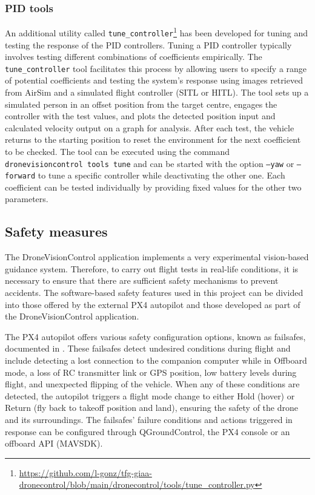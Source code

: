 \subsubsection{PID tools}
An additional utility called \texttt{tune\_controller}\footnote{\url{https://github.com/l-gonz/tfg-giaa-dronecontrol/blob/main/dronecontrol/tools/tune_controller.py}} has been developed for tuning and testing the response of the PID controllers. Tuning a PID controller typically involves testing different combinations of coefficients empirically. The \texttt{tune\_controller} tool facilitates this process by allowing users to specify a range of potential coefficients and testing the system's response using images retrieved from AirSim and a simulated flight controller (SITL or HITL). The tool sets up a simulated person in an offset position from the target centre, engages the controller with the test values, and plots the detected position input and calculated velocity output on a graph for analysis. After each test, the vehicle returns to the starting position to reset the environment for the next coefficient to be checked. The tool can be executed using the command \texttt{dronevisioncontrol tools tune} and can be started with the option \texttt{--yaw} or \texttt{--forward} to tune a specific controller while deactivating the other one. Each coefficient can be tested individually by providing fixed values for the other two parameters.


\subsection{Safety measures}
\label{subsec:safety}

The DroneVisionControl application implements a very experimental vision-based guidance system.
Therefore, to carry out flight tests in real-life conditions, it is necessary to ensure that there are sufficient safety mechanisms to prevent accidents. The software-based safety features used in this project can be divided into those offered by the external PX4 autopilot and those developed as part of the DroneVisionControl application.

The PX4 autopilot offers various safety configuration options, known as failsafes, documented in  \cite{px4-docs-safety}. These failsafes detect undesired conditions during flight and include detecting a lost connection to the companion computer while in Offboard mode, a loss of RC transmitter link or GPS position, low battery levels during flight, and unexpected flipping of the vehicle. When any of these conditions are detected, the autopilot triggers a flight mode change to either Hold (hover) or Return (fly back to takeoff position and land), ensuring the safety of the drone and its surroundings. The failsafes' failure conditions and actions triggered in response can be configured through QGroundControl, the PX4 console or an offboard API (MAVSDK).

